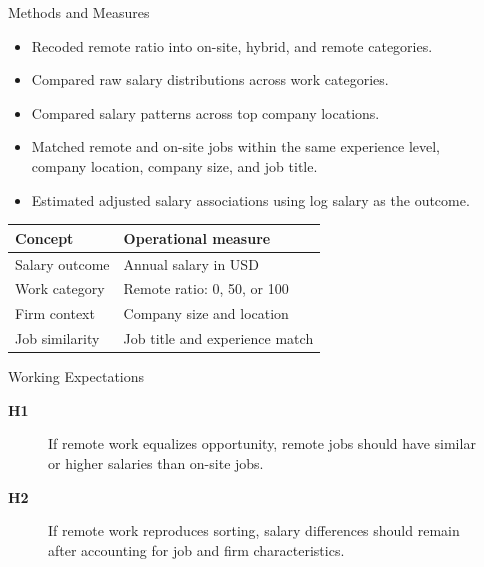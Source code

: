 \documentclass[final]{beamer}
\newlength{\sepwidth}
\newlength{\colwidth}
\newcommand{\separatorcolumn}{\begin{column}{\sepwidth}\end{column}}
\begin{document}
\begin{frame}[t]
\begin{columns}[t]
\begin{column}{\colwidth}
  \begin{block}{Methods and Measures}
    \begin{itemize}
      \item Recoded remote ratio into on-site, hybrid, and remote categories.
      \item Compared raw salary distributions across work categories.
      \item Compared salary patterns across top company locations.
      \item Matched remote and on-site jobs within the same experience level, company location, company size, and job title.
      \item Estimated adjusted salary associations using log salary as the outcome.
    \end{itemize}

    \begin{center}
    \begin{minipage}{0.92\linewidth}
    \renewcommand{\arraystretch}{1.22}
    \Large
    \begin{tabularx}{\linewidth}{lX}
      \toprule
      \textbf{Concept} & \textbf{Operational measure} \\
      \midrule
      Salary outcome & Annual salary in USD \\
      Work category & Remote ratio: 0, 50, or 100 \\
      Firm context & Company size and location \\
      Job similarity & Job title and experience match \\
      \bottomrule
    \end{tabularx}
    \end{minipage}
    \end{center}
  \end{block}

  \begin{block}{Working Expectations}
    \begin{description}
      \item[\textbf{H1}] If remote work equalizes opportunity, remote jobs should have similar or higher salaries than on-site jobs.
      \item[\textbf{H2}] If remote work reproduces sorting, salary differences should remain after accounting for job and firm characteristics.
    \end{description}
  \end{block}

\end{column}
\separatorcolumn


\end{columns}
\end{frame}
\end{document}
